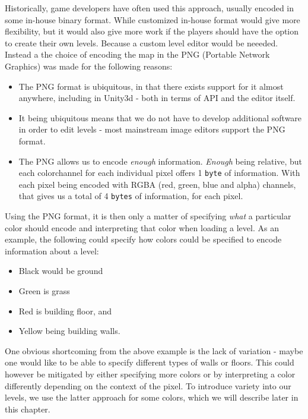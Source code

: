 Historically, game developers have often used this approach, usually encoded in some in-house binary format. 
While customized in-house format would give more flexibility, but it would also give more work if the players should have the option to create their own levels. Because a custom level editor would be neeeded.
Instead a the choice of encoding the map in the PNG (Portable Network Graphics) was made for the following reasons:
\begin{itemize}
    \item The PNG format is ubiquitous, in that there exists support for it
        almost anywhere, including in Unity3d - both in terms of API and the
        editor itself.
    \item It being ubiquitous means that we do not have to develop additional
        software in order to edit levels - most mainstream image editors
        support the PNG format.
    \item The PNG allows us to encode \textit{enough} information.
        \textit{Enough} being relative, but each colorchannel for each
        individual pixel offers 1 \texttt{byte} of information. With each pixel
        being encoded with RGBA (red, green, blue and alpha) channels, that
        gives us a total of 4 \texttt{bytes} of information, for each pixel.
\end{itemize}
Using the PNG format, it is then only a matter of specifying \textit{what} a particular color should encode and interpreting that color when loading a level. 
As an example, the following could specify how colors could be specified to encode information about a level:
\begin{itemize}
    \item Black would be ground
    \item Green is grass
    \item Red is building floor, and
    \item Yellow being building walls.
\end{itemize}
One obvious shortcoming from the above example is the lack of variation - maybe one would like to be able to specify different types of walls or floors. This could however be mitigated by either specifying more colors or by interpreting a color differently depending on the context of the pixel.
To introduce variety into our levels, we use the latter approach for some colors, which we will describe later in this chapter.
\\

